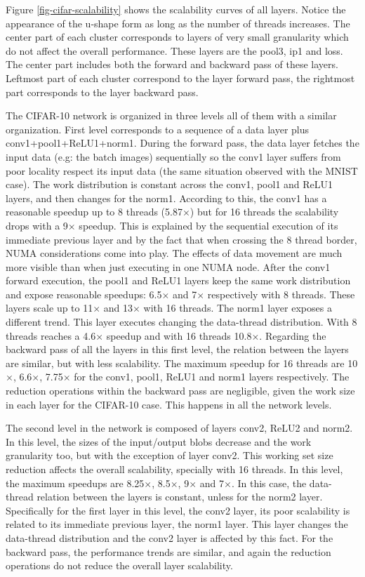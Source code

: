 Figure \ref{fig-cifar-scalability} shows the scalability curves of all layers. 
Notice the appearance of the u-shape form as long as the number of threads 
increases. The center part of each cluster corresponds to layers of very 
small granularity which do not affect the overall performance. These layers 
are the pool3, ip1 and loss. The center part includes both the forward 
and backward pass of these layers. Leftmost part of each cluster 
correspond to the layer forward pass, the rightmost part corresponds 
to the layer backward pass.

The CIFAR-10 network is organized in three levels all of them with a 
similar organization. First level corresponds to a sequence of a data 
layer plus conv1+pool1+ReLU1+norm1. During the forward pass, the data 
layer fetches the input data (e.g: the batch images) sequentially so 
the conv1 layer suffers from poor locality respect its input data 
(the same situation observed with the MNIST case). The work distribution 
is constant across the conv1, pool1 and ReLU1 layers, and then changes 
for the norm1. According to this, the conv1 has a 
reasonable speedup up to 8 threads (5.87$\times$) but for 16 threads the 
scalability drops with a 9$\times$ speedup. This is explained by the 
sequential execution of its immediate previous layer and by the fact 
that when crossing the 8 thread border, NUMA considerations come into 
play. The effects of data movement are much more visible than when 
just executing in one NUMA node. After the conv1 forward execution, 
the pool1 and ReLU1 layers keep the same work distribution and expose 
reasonable speedups: 6.5$\times$ and 7$\times$ respectively with 8 threads. These 
layers scale up to 11$\times$ and 13$\times$ with 16 threads. The norm1 layer exposes 
a different trend. This layer executes changing the data-thread 
distribution. With 8 threads reaches a 4.6$\times$ speedup and with 
16 threads 10.8$\times$. Regarding the backward pass of all the layers 
in this first level, the relation between the layers are similar, 
but with less scalability. The maximum speedup for 16 threads are 
10$\times$, 6.6$\times$, 7.75$\times$ for the conv1, pool1, ReLU1 and norm1 layers respectively. 
The reduction operations within the backward pass are negligible, 
given the work size in each layer for the CIFAR-10 case. This happens 
in all the network levels.

The second level in the network is composed of layers conv2, ReLU2 
and norm2. In this level, the sizes of the input/output blobs decrease 
and the work granularity too, but with the exception of layer conv2. 
This working set size reduction affects the overall scalability, 
specially with 16 threads. In this level, the maximum speedups are 
8.25$\times$, 8.5$\times$, 9$\times$ and 7$\times$. In this case, the data-thread relation between the 
layers is constant, unless for the norm2 layer. Specifically for the 
first layer in this level, the conv2 layer, its poor scalability is 
related to its immediate previous layer, the norm1 layer. This layer 
changes the data-thread distribution and the conv2 layer is affected 
by this fact. For the backward pass, the performance trends are similar, 
and again the reduction operations do not reduce the overall layer 
scalability.

